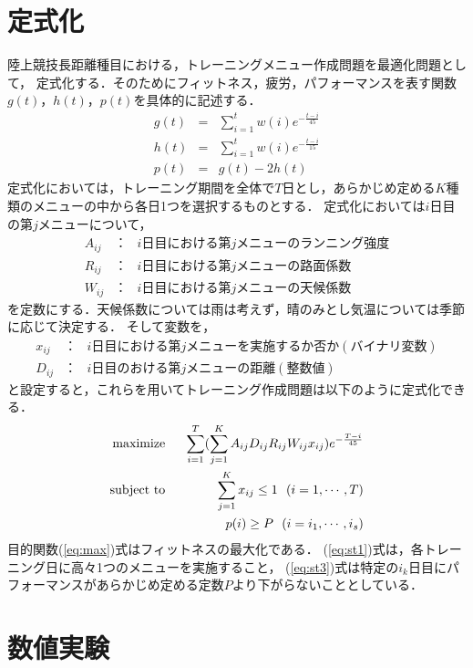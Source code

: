 \documentclass[12pt]{jarticle}
\begin{document}
\section{定式化}
陸上競技長距離種目における，トレーニングメニュー作成問題を最適化問題として，
定式化する．そのためにフィットネス，疲労，パフォーマンスを表す関数$g(t)$，$h(t)$，$p(t)$を具体的に記述する．
\begin{eqnarray}
  g(t)&=&\sum_{i=1}^t w(i)e^{-\frac{t-i}{45}}\label{eq:fit2}\\%
  h(t)&=&\sum_{i=1}^t w(i)e^{-\frac{t-i}{15}}\label{eq:fig2}\\%
  p(t)&=&g(t)-2h(t)\label{eq:per2}%
\end{eqnarray}
定式化においては，トレーニング期間を全体で$T$日とし，あらかじめ定める$K$種類のメニューの中から各日1つを選択するものとする．
定式化においては$i$日目の第$j$メニューについて，
\begin{eqnarray}
  A_{ij}&：&i日目における第jメニューのランニング強度\nonumber\\
  R_{ij}&：&i日目における第jメニューの路面係数\nonumber\\
  W_{ij}&：&i日目における第jメニューの天候係数\nonumber
\end{eqnarray}
を定数にする．天候係数については雨は考えず，晴のみとし気温については季節に応じて決定する．
そして変数を，
\begin{eqnarray}
  x_{ij}&：&i日目における第jメニューを実施するか否か(バイナリ変数)\nonumber\\
  D_{ij}&：&i日目のおける第jメニューの距離(整数値)\nonumber
\end{eqnarray}
と設定すると，これらを用いてトレーニング作成問題は以下のように定式化できる．
\begin{eqnarray}
  \mathop{\rm maximize}&\ \ &\sum_{i=1}^T (\sum_{j=1}^K A_{ij}D_{ij}R_{ij}W_{ij}x_{ij})e^{-\frac{T-i}{45}}\label{eq:max}\\%
  \mathop{\rm subject\ to}&\ \ &\sum_{j=1}^K x_{ij}\leq 1\ \ (i=1,\cdots , T)\label{eq:st1}\\%
  &&p(i)\geq P\ \ (i=i_1,\cdots , i_s)\label{eq:st3}%
\end{eqnarray}
目的関数(\ref{eq:max})式はフィットネスの最大化である．
(\ref{eq:st1})式は，各トレーニング日に高々1つのメニューを実施すること，
(\ref{eq:st3})式は特定の$i_k$日目にパフォーマンスがあらかじめ定める定数$P$より下がらないこととしている．


\section{数値実験}
\end{document}
